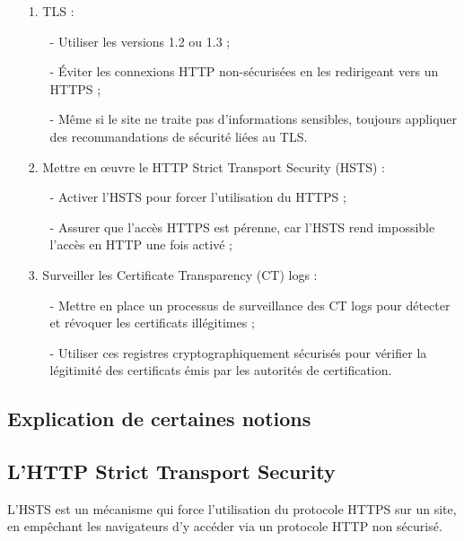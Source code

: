 \documentclass[12pt,a4paper]{article}
\begin{document}
	\begin{itemize}
		\item[1.] TLS : \begin{itemize}
			\item[-] Utiliser les versions 1.2 ou 1.3 ;
			\item[-] Éviter les connexions HTTP non-sécurisées en les redirigeant vers un HTTPS ;
			\item[-] Même si le site ne traite pas d'informations sensibles, toujours appliquer des recommandations de sécurité liées au TLS. \\
		\end{itemize}
		
		\item[2.] Mettre en œuvre le HTTP Strict Transport Security (HSTS) : \begin{itemize}
			\item[-] Activer l'HSTS pour forcer l'utilisation du HTTPS ;
			\item[-] Assurer que l'accès HTTPS est pérenne, car l'HSTS rend impossible l'accès en HTTP une fois activé ; \\
		\end{itemize}
		
		\item[3.] Surveiller les Certificate Transparency (CT) logs : \begin{itemize}
			\item[-] Mettre en place un processus de surveillance des CT logs pour détecter et révoquer les certificats illégitimes ;
			\item[-] Utiliser ces registres cryptographiquement sécurisés pour vérifier la légitimité des certificats émis par les autorités de certification.
		\end{itemize}
	\end{itemize}
	
	\subsection{Explication de certaines notions}
	
	\subsection{L'HTTP Strict Transport Security}
	
	L'HSTS est un mécanisme qui force l'utilisation du protocole HTTPS sur un site, en empêchant les navigateurs d'y accéder via un protocole HTTP non sécurisé. 
	
\end{document}

